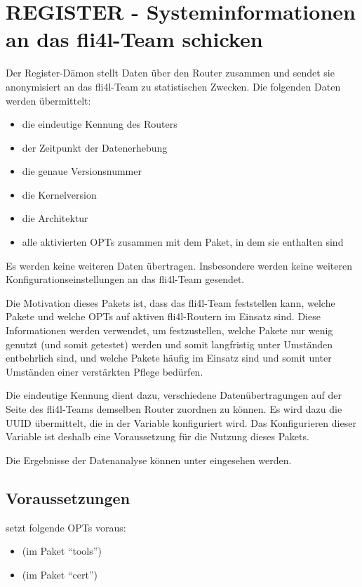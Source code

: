 \section{REGISTER - Systeminformationen an das fli4l-Team schicken}

Der Register-Dämon stellt Daten über den Router zusammen und sendet sie
anonymisiert an das fli4l-Team zu statistischen Zwecken. Die folgenden Daten
werden übermittelt:

\begin{itemize}
\item die eindeutige Kennung des Routers
\item der Zeitpunkt der Datenerhebung
\item die genaue Versionsnummer
\item die Kernelversion
\item die Architektur
\item alle aktivierten OPTs zusammen mit dem Paket, in dem sie enthalten sind
\end{itemize}

Es werden keine weiteren Daten übertragen. Insbesondere werden keine weiteren
Konfigurationseinstellungen an das fli4l-Team gesendet.

Die Motivation dieses Pakets ist, dass das fli4l-Team feststellen kann, welche
Pakete und welche OPTs auf aktiven fli4l-Routern im Einsatz sind. Diese
Informationen werden verwendet, um festzustellen, welche Pakete nur wenig
genutzt (und somit getestet) werden und somit langfristig unter Umständen
entbehrlich sind, und welche Pakete häufig im Einsatz sind und somit unter
Umständen einer verstärkten Pflege bedürfen.

Die eindeutige Kennung dient dazu, verschiedene Datenübertragungen auf der
Seite des fli4l-Teams demselben Router zuordnen zu können. Es wird dazu die
UUID übermittelt, die in der Variable  konfiguriert wird.
Das Konfigurieren dieser Variable ist deshalb eine Voraussetzung für die
Nutzung dieses Pakets.

Die Ergebnisse der Datenanalyse können unter 
eingesehen werden.

\subsection{Voraussetzungen}

 setzt folgende OPTs voraus:
\begin{itemize}
\item {} (im Paket ``tools'')
\item {} (im Paket ``cert'')
\end{itemize}

